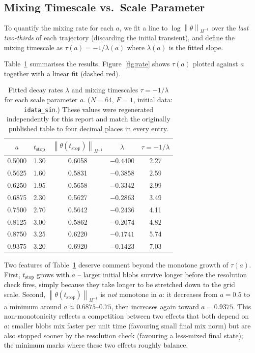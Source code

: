 \documentclass[12pt,a4paper]{article}
\newcommand{\norm}[1]{\left\lVert#1\right\rVert}
\theoremstyle{definition}
\theoremstyle{plain}
\begin{document}
\subsection{Mixing Timescale vs.\ Scale Parameter}
\label{sec:rate}

To quantify the mixing rate for each $a$, we fit a line to
$\log\norm{\theta}_{H^{-1}}$ over the \emph{last two-thirds} of each
trajectory (discarding the initial transient), and define the mixing
timescale as $\tau(a) = -1/\lambda(a)$ where $\lambda(a)$ is the fitted slope.

Table~\ref{tab:rates} summarises the results.
Figure~\ref{fig:rate} shows $\tau(a)$ plotted against $a$ together with a
linear fit (dashed red).

\begin{table}[H]
  \centering
  \caption{%
    Fitted decay rates $\lambda$ and mixing timescales $\tau=-1/\lambda$
    for each scale parameter $a$.
    ($N=64$, $F=1$, initial data: \texttt{idata\_sin}.)
    These values were regenerated independently for this report and match
    the originally published table to four decimal places in every entry.
  }
  \label{tab:rates}
  \begin{tabular}{ccccc}
    \toprule
    $a$ & $t_{\text{stop}}$ & $\norm{\theta(t_{\text{stop}})}_{H^{-1}}$
        & $\lambda$ & $\tau = -1/\lambda$ \\
    \midrule
    0.5000 & 1.30 & 0.6058 & $-0.4400$ & 2.27 \\
    0.5625 & 1.60 & 0.5831 & $-0.3858$ & 2.59 \\
    0.6250 & 1.95 & 0.5658 & $-0.3342$ & 2.99 \\
    0.6875 & 2.30 & 0.5627 & $-0.2863$ & 3.49 \\
    0.7500 & 2.70 & 0.5642 & $-0.2436$ & 4.11 \\
    0.8125 & 3.00 & 0.5862 & $-0.2074$ & 4.82 \\
    0.8750 & 3.25 & 0.6220 & $-0.1741$ & 5.74 \\
    0.9375 & 3.20 & 0.6920 & $-0.1423$ & 7.03 \\
    \bottomrule
  \end{tabular}
\end{table}

Two features of Table~\ref{tab:rates} deserve comment beyond the monotone
growth of $\tau(a)$. First, $t_{\text{stop}}$ grows with $a$ -- larger
initial blobs survive longer before the resolution check fires, simply
because they take longer to be stretched down to the grid scale. Second,
$\norm{\theta(t_{\text{stop}})}_{H^{-1}}$ is \emph{not} monotone in $a$: it
decreases from $a=0.5$ to a minimum around $a\approx0.6875$--$0.75$, then
increases again toward $a=0.9375$. This non-monotonicity reflects a
competition between two effects that both depend on $a$: smaller blobs mix
faster per unit time (favouring small final mix norm) but are also stopped
sooner by the resolution check (favouring a less-mixed final state); the
minimum marks where these two effects roughly balance.
\end{document}
